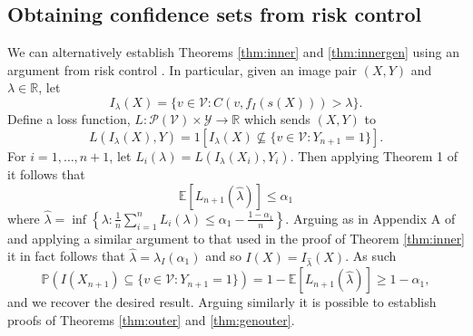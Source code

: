\subsection{Obtaining confidence sets from risk control}\label{risk2con}
We can alternatively establish Theorems \ref{thm:inner} and \ref{thm:innergen} using an argument from risk control \citep{Angelopoulos2022}. In particular, given an image pair $(X,Y)$ and $\lambda \in \mathbb{R}$, let $$I_\lambda(X) =  \lbrace v \in \mathcal{V}: C(v, f_I(s(X))) > \lambda \rbrace.$$ Define a loss function, $L:\mathcal{P}(\mathcal{V}) \times \mathcal{Y} \rightarrow \mathbb{R}$ which sends $(X,Y)$ to 
\begin{equation*}
	L(I_\lambda(X), Y) = 1\left[ I_\lambda(X) \not \subseteq\lbrace v\in \mathcal{V}: Y_{n+1} = 1 \rbrace \right].
\end{equation*}
For $i = 1, \dots, n + 1$, let 	$L_i(\lambda) = 	L(I_\lambda(X_i), Y_i)$. Then applying Theorem 1 of \cite{Angelopoulos2022} it follows that 
\begin{equation*}
	\mathbb{E}\left[ L_{n+1}(\hat{\lambda})\right] \leq \alpha_1
\end{equation*}
where $\hat{\lambda} = \inf\left\lbrace \lambda: \frac{1}{n}\sum_{i = 1}^n L_i(\lambda) \leq \alpha_1 - \frac{1-\alpha_1}{n}\right\rbrace$. Arguing as in Appendix A of \citep{Angelopoulos2022} and applying a similar argument to that used in the proof of Theorem \ref{thm:inner} it in fact follows that $\hat{\lambda}  = \lambda_I(\alpha_1)$ and so $I(X) = I_{\hat{\lambda}}(X)$. As such 	
\begin{equation}\label{eq:probstat2}
	\mathbb{P}\left( I(X_{n+1}) \subseteq\lbrace v\in \mathcal{V}: Y_{n+1} = 1 \rbrace \right) = 1 - \mathbb{E}\left[ L_{n+1}(\hat{\lambda})\right]  \geq 1 - \alpha_1, 
\end{equation}
and we recover the desired result. Arguing similarly it is possible to establish proofs of Theorems \ref{thm:outer} and \ref{thm:genouter}.

